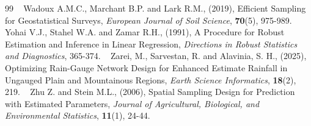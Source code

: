 \documentclass[twoside]{article}
\begin{document}
\begin{thebibliography}{99}
 
Wadoux A.M.C., Marchant B.P. and Lark R.M., (2019), Efficient Sampling for Geostatistical Surveys, {\it European Journal of Soil Science}, \textbf{70}(5), 975-989.
 
Yohai V.J., Stahel W.A. and Zamar R.H., (1991), A Procedure for Robust Estimation and Inference in Linear Regression, {\it Directions in Robust Statistics and Diagnostics}, 365-374.
 
Zarei, M., Sarvestan, R. and Alavinia, S. H., (2025), Optimizing Rain-Gauge Network Design for Enhanced Estimate Rainfall in Ungauged Plain and Mountainous Regions, {\it Earth Science Informatics}, \textbf{18}(2), 219.
 
Zhu Z. and Stein M.L., (2006), Spatial Sampling Design for Prediction with Estimated Parameters, {\it Journal of Agricultural, Biological, and Environmental Statistics}, \textbf{11}(1), 24-44.
 
\end{thebibliography}
\end{document}
